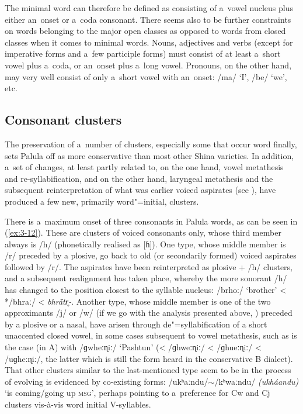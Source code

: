 The minimal word can therefore be defined as consisting of a~vowel nucleus plus either an~onset or a~coda consonant. There seems also to be further constraints on words belonging to the major open classes as opposed to words from closed classes when it comes to minimal words. Nouns, adjectives and verbs (except for imperative forms and a~few participle forms) must consist of at least a~short vowel plus a~coda, or an~onset plus a~long vowel. Pronouns, on the other hand, may very well consist of only a~short vowel with an~onset: /ma/ `I', /be/ `we', etc.


\subsection{Consonant clusters}
\label{subsec:3-3-2}


The preservation of a~number of clusters, especially some that occur word finally, sets Palula off as more conservative than most other Shina varieties. In addition, a~set of changes, at least partly related to, on the one hand, vowel metathesis and re-syllabification, and on the other hand, laryngeal metathesis and the subsequent reinterpretation of what was earlier voiced aspirates (see ), have produced a few new, primarily word"=initial, clusters.


There is a~maximum onset of three consonants in Palula words, as can be seen in (\ref{ex:3-12}). These are clusters of voiced consonants only, whose third member always is /h/ (phonetically realised as [ɦ]).  One type, whose middle member is /r/ preceded by a plosive, go back to old (or secondarily formed) voiced aspirates followed by /r/. The aspirates have been reinterpreted as plosive + /h/ clusters, and a subsequent realignment has taken place, whereby the more sonorant /h/ has changed to the position closest to the syllable nucleus: /brhoː/ `brother' < */bhraː/ < \textit{bhr\'{\={a}}tr̥-}. Another type, whose middle member is one of the two approximants /j/ or /w/ (if we go with the analysis presented above, ) preceded by a plosive or a nasal, have arisen through de"=syllabification of a short unaccented closed vowel, in some cases subsequent to vowel metathesis, such as is the case (in A) with /ɡwheːɳiː/ `Pashtun' (< /ɡhweːɳiː/ < /ɡhueːɳiː/ < /uɡheːɳiː/, the latter which is still the form heard in the conservative B dialect). That other clusters similar to the last-mentioned type seem to be in the process of evolving is evidenced by co-existing forms: /ukʰaːndu/$\sim$/kʰwaːndu/ \textit{(ukháandu)} `is coming/going up \textsc{msg}', perhaps pointing to a~preference for Cw and Cj clusters vis-à-vis word initial V-syllables. 


